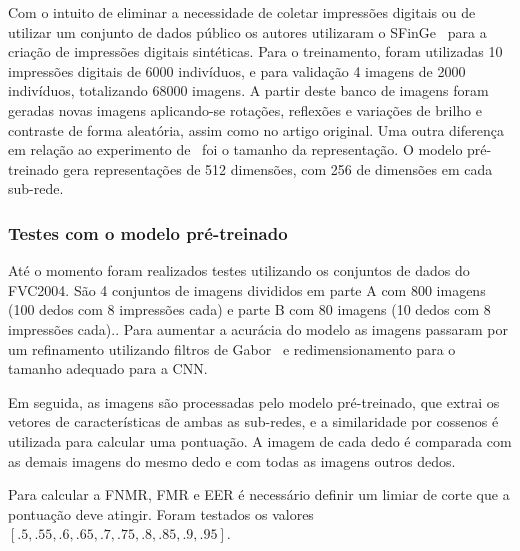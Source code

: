 Com o intuito de eliminar a necessidade de coletar impressões digitais ou de utilizar um conjunto de dados público os autores utilizaram o SFinGe~\cite{handbook_of_fp_recognition} para a criação de impressões digitais sintéticas. Para o treinamento, foram utilizadas 10 impressões digitais de 6000 indivíduos, e para validação 4 imagens de 2000 indivíduos, totalizando 68000 imagens. A partir deste banco de imagens foram geradas novas imagens aplicando-se rotações, reflexões e variações de brilho e contraste de forma aleatória, assim como no artigo original. Uma outra diferença em relação ao experimento de~ foi o tamanho da representação. O modelo pré-treinado gera representações de 512 dimensões, com 256 de dimensões em cada sub-rede.  


\subsubsection{Testes com o modelo pré-treinado}\label{subsubsec:deepprint-testing}

Até o momento foram realizados testes utilizando os conjuntos de dados do FVC2004. São 4 conjuntos de imagens divididos em parte A com 800 imagens (100 dedos com 8 impressões cada) e parte B com 80 imagens (10 dedos com 8 impressões cada).. Para aumentar a acurácia do modelo as imagens passaram por um refinamento utilizando filtros de Gabor~\cite{gabor-wavelet-transform} e redimensionamento para o tamanho adequado para a CNN.

Em seguida, as imagens são processadas pelo modelo pré-treinado, que extrai os vetores de características de ambas as sub-redes, e a similaridade por cossenos é utilizada para calcular uma pontuação. A imagem de cada dedo é comparada com as demais imagens do mesmo dedo e com todas as imagens outros dedos.

Para calcular a FNMR, FMR e EER é necessário definir um limiar de corte que a pontuação deve atingir. Foram testados os valores $[.5, .55, .6, .65, .7, .75, .8, .85, .9, .95]$.
